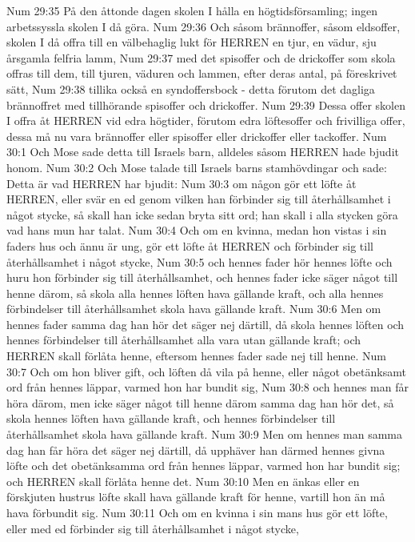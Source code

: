 Num 29:35  På den åttonde dagen skolen I hålla en högtidsförsamling; ingen arbetssyssla skolen I då göra.
Num 29:36  Och såsom brännoffer, såsom eldsoffer, skolen I då offra till en välbehaglig lukt för HERREN en tjur, en vädur, sju årsgamla felfria lamm,
Num 29:37  med det spisoffer och de drickoffer som skola offras till dem, till tjuren, väduren och lammen, efter deras antal, på föreskrivet sätt,
Num 29:38  tillika också en syndoffersbock - detta förutom det dagliga brännoffret med tillhörande spisoffer och drickoffer.
Num 29:39  Dessa offer skolen I offra åt HERREN vid edra högtider, förutom edra löftesoffer och frivilliga offer, dessa må nu vara brännoffer eller spisoffer eller drickoffer eller tackoffer.
Num 30:1  Och Mose sade detta till Israels barn, alldeles såsom HERREN hade bjudit honom.
Num 30:2  Och Mose talade till Israels barns stamhövdingar och sade: Detta är vad HERREN har bjudit:
Num 30:3  om någon gör ett löfte åt HERREN, eller svär en ed genom vilken han förbinder sig till återhållsamhet i något stycke, så skall han icke sedan bryta sitt ord; han skall i alla stycken göra vad hans mun har talat.
Num 30:4  Och om en kvinna, medan hon vistas i sin faders hus och ännu är ung, gör ett löfte åt HERREN och förbinder sig till återhållsamhet i något stycke,
Num 30:5  och hennes fader hör hennes löfte och huru hon förbinder sig till återhållsamhet, och hennes fader icke säger något till henne därom, så skola alla hennes löften hava gällande kraft, och alla hennes förbindelser till återhållsamhet skola hava gällande kraft.
Num 30:6  Men om hennes fader samma dag han hör det säger nej därtill, då skola hennes löften och hennes förbindelser till återhållsamhet alla vara utan gällande kraft; och HERREN skall förlåta henne, eftersom hennes fader sade nej till henne.
Num 30:7  Och om hon bliver gift, och löften då vila på henne, eller något obetänksamt ord från hennes läppar, varmed hon har bundit sig,
Num 30:8  och hennes man får höra därom, men icke säger något till henne därom samma dag han hör det, så skola hennes löften hava gällande kraft, och hennes förbindelser till återhållsamhet skola hava gällande kraft.
Num 30:9  Men om hennes man samma dag han får höra det säger nej därtill, då upphäver han därmed hennes givna löfte och det obetänksamma ord från hennes läppar, varmed hon har bundit sig; och HERREN skall förlåta henne det.
Num 30:10  Men en änkas eller en förskjuten hustrus löfte skall hava gällande kraft för henne, vartill hon än må hava förbundit sig.
Num 30:11  Och om en kvinna i sin mans hus gör ett löfte, eller med ed förbinder sig till återhållsamhet i något stycke,
